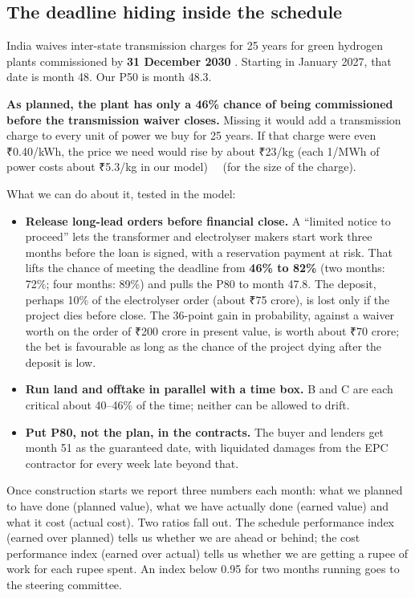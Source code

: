 \subsection{The deadline hiding inside the schedule}
India waives inter-state transmission charges for 25 years for green hydrogen plants commissioned by \textbf{31 December 2030} \cite{sq2023ists} \rep. Starting in January 2027, that date is month 48. Our P50 is month 48.3.

\begin{verdict}
\textbf{As planned, the plant has only a 46\% chance of being commissioned before the transmission waiver closes.} Missing it would add a transmission charge to every unit of power we buy for 25 years. If that charge were even ₹0.40/kWh, the price we need would rise by about ₹23/kg (each \usd{}1/MWh of power costs about ₹5.3/kg in our model) \estd\ \confL\ (for the size of the charge).
\end{verdict}

\noindent What we can do about it, tested in the model:
\begin{itemize}
\item \textbf{Release long-lead orders before financial close.} A ``limited notice to proceed'' lets the transformer and electrolyser makers start work three months before the loan is signed, with a reservation payment at risk. That lifts the chance of meeting the deadline from \textbf{46\% to 82\%} (two months: 72\%; four months: 89\%) and pulls the P80 to month 47.8. The deposit, perhaps 10\% of the electrolyser order (about ₹75 crore), is lost only if the project dies before close. The 36-point gain in probability, against a waiver worth on the order of ₹200 crore in present value, is worth about ₹70 crore; the bet is favourable as long as the chance of the project dying after the deposit is low. \estd
\item \textbf{Run land and offtake in parallel with a time box.} B and C are each critical about 40--46\% of the time; neither can be allowed to drift.
\item \textbf{Put P80, not the plan, in the contracts.} The buyer and lenders get month 51 as the guaranteed date, with liquidated damages from the EPC contractor for every week late beyond that.
\end{itemize}

\begin{plainwords}
Once construction starts we report three numbers each month: what we planned to have done (planned value), what we have actually done (earned value) and what it cost (actual cost). Two ratios fall out. The schedule performance index (earned over planned) tells us whether we are ahead or behind; the cost performance index (earned over actual) tells us whether we are getting a rupee of work for each rupee spent. An index below 0.95 for two months running goes to the steering committee.
\end{plainwords}
\newpage
